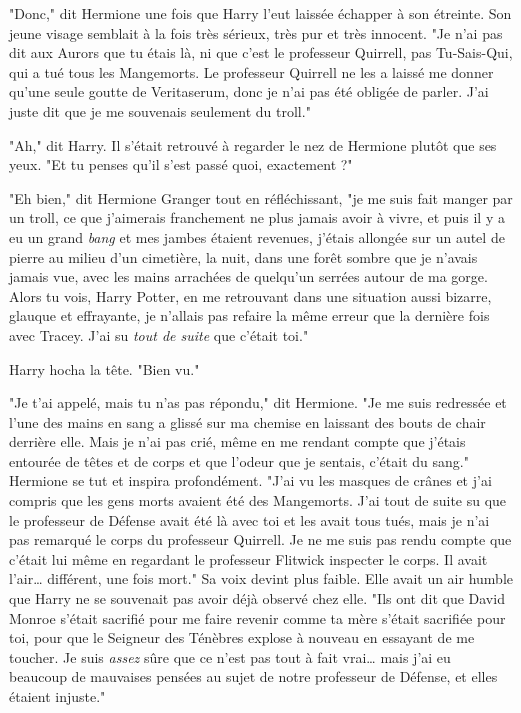 "Donc," dit Hermione une fois que Harry l'eut laissée échapper à son étreinte. Son jeune visage semblait à la fois très sérieux, très pur et très innocent. "Je n'ai pas dit aux Aurors que tu étais là, ni que c'est le professeur Quirrell, pas Tu-Sais-Qui, qui a tué tous les Mangemorts. Le professeur Quirrell ne les a laissé me donner qu'une seule goutte de Veritaserum, donc je n'ai pas été obligée de parler. J'ai juste dit que je me souvenais seulement du troll."

"Ah," dit Harry. Il s'était retrouvé à regarder le nez de Hermione plutôt que ses yeux. "Et tu penses qu'il s'est passé quoi, exactement ?"

"Eh bien," dit Hermione Granger tout en réfléchissant, "je me suis fait manger par un troll, ce que j'aimerais franchement ne plus jamais avoir à vivre, et puis il y a eu un grand \emph{bang}  et mes jambes étaient revenues, j'étais allongée sur un autel de pierre au milieu d'un cimetière, la nuit, dans une forêt sombre que je n'avais jamais vue, avec les mains arrachées de quelqu'un serrées autour de ma gorge. Alors tu vois, Harry Potter, en me retrouvant dans une situation aussi bizarre, glauque et effrayante, je n'allais pas refaire la même erreur que la dernière fois avec Tracey. J'ai su \emph{tout de suite}  que c'était toi."

Harry hocha la tête. "Bien vu."

"Je t'ai appelé, mais tu n'as pas répondu," dit Hermione. "Je me suis redressée et l'une des mains en sang a glissé sur ma chemise en laissant des bouts de chair derrière elle. Mais je n'ai pas crié, même en me rendant compte que j'étais entourée de têtes et de corps et que l'odeur que je sentais, c'était du sang." Hermione se tut et inspira profondément. "J'ai vu les masques de crânes et j'ai compris que les gens morts avaient été des Mangemorts. J'ai tout de suite su que le professeur de Défense avait été là avec toi et les avait tous tués, mais je n'ai pas remarqué le corps du professeur Quirrell. Je ne me suis pas rendu compte que c'était lui même en regardant le professeur Flitwick inspecter le corps. Il avait l'air… différent, une fois mort." Sa voix devint plus faible. Elle avait un air humble que Harry ne se souvenait pas avoir déjà observé chez elle. "Ils ont dit que David Monroe s'était sacrifié pour me faire revenir comme ta mère s'était sacrifiée pour toi, pour que le Seigneur des Ténèbres explose à nouveau en essayant de me toucher. Je suis \emph{assez}  sûre que ce n'est pas tout à fait vrai… mais j'ai eu beaucoup de mauvaises pensées au sujet de notre professeur de Défense, et elles étaient injuste."


